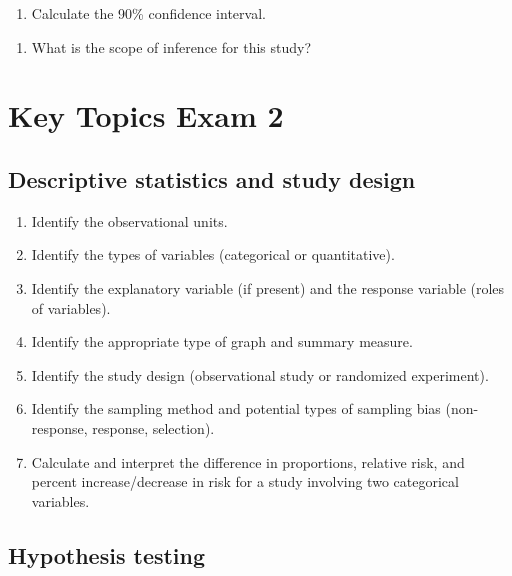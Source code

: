 \documentclass[
]{report}
\providecommand{\tightlist}{%
  \setlength{\itemsep}{0pt}\setlength{\parskip}{0pt}}
\begin{document}
\begin{enumerate}
\def\labelenumi{\arabic{enumi}.}
\setcounter{enumi}{18}
\tightlist
\item
  Calculate the 90\% confidence interval.
\end{enumerate}

\vspace{1in}

\begin{enumerate}
\def\labelenumi{\arabic{enumi}.}
\setcounter{enumi}{19}
\tightlist
\item
  What is the scope of inference for this study?
\end{enumerate}

\newpage

\section{Key Topics Exam 2}\label{key-topics-exam-2}

\subsection*{Descriptive statistics and study design}\label{descriptive-statistics-and-study-design}

\begin{enumerate}
\def\labelenumi{\arabic{enumi}.}
\item
  Identify the observational units.
\item
  Identify the types of variables (categorical or quantitative).
\item
  Identify the explanatory variable (if present) and the response variable (roles of variables).
\item
  Identify the appropriate type of graph and summary measure.
\item
  Identify the study design (observational study or randomized experiment).
\item
  Identify the sampling method and potential types of sampling bias (non-response, response, selection).
\item
  Calculate and interpret the difference in proportions, relative risk, and percent increase/decrease in risk for a study involving two categorical variables.
\end{enumerate}

\subsection*{Hypothesis testing}\label{hypothesis-testing-2}
\end{document}
